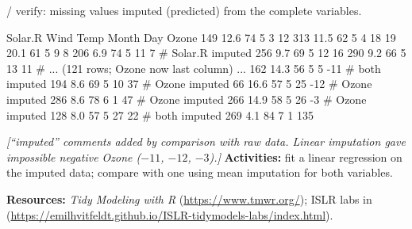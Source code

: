 / verify: missing values imputed (predicted) from the complete variables.
\begin{routput}
Solar.R Wind Temp Month Day Ozone
    149 12.6   74     5   3    12
    313 11.5   62     5   4    18
     19 20.1   61     5   9     8
    206  6.9   74     5  11     7   # Solar.R imputed
    256  9.7   69     5  12    16
    290  9.2   66     5  13    11
# ... (121 rows; Ozone now last column) ...
    162 14.3   56     5   5   -11   # both imputed
    194  8.6   69     5  10    37   # Ozone imputed
     66 16.6   57     5  25   -12   # Ozone imputed
    286  8.6   78     6   1    47   # Ozone imputed
    266 14.9   58     5  26    -3   # Ozone imputed
    128  8.0   57     5  27    22   # both imputed
    269  4.1   84     7   1   135
\end{routput}
{\color{figgray}\itshape [``imputed'' comments added by comparison with raw data. Linear imputation gave impossible negative Ozone ($-11$, $-12$, $-3$).]}
\textbf{Activities:} fit a linear regression on the imputed data; compare with one using mean imputation for both variables.

\textbf{Resources:} \emph{Tidy Modeling with R} (\url{https://www.tmwr.org/}); ISLR labs in  (\url{https://emilhvitfeldt.github.io/ISLR-tidymodels-labs/index.html}).
